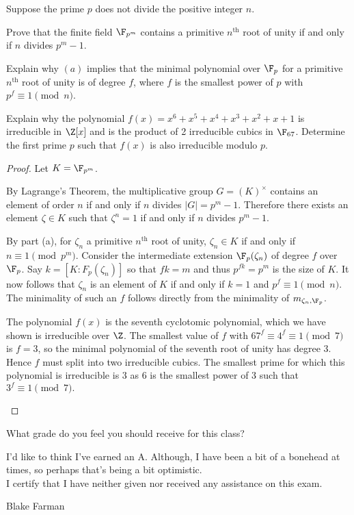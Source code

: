 \documentclass[10pt]{amsart}
\begin{document}
\begin{thm}
  \label{Ex9}
  Suppose the prime $p$ does not divide the positive integer $n$.
  \begin{alphaenum}
  \item
    Prove that the finite field $\F_{p^m}$ contains a primitive $n^{\text{th}}$ root of unity if and only if $n$ divides $p^m - 1$.
  \item
    Explain why $(a)$ implies that the minimal polynomial over $\F_p$ for a primitive $n^{\text{th}}$ root of unity is of degree $f$, where $f$ is the smallest power of $p$ with $p^f \equiv 1 \pmod n$.
  \item
    Explain why the polynomial $f(x) = x^6 + x^5 + x^4 + x^3 + x^2 + x + 1$ is irreducible in $\Z[x]$ and is the product of 2 irreducible cubics in $\F_{67}$.
    Determine the first prime $p$ such that $f(x)$ is also irreducible modulo $p$.
  \end{alphaenum}
  \begin{proof}
    Let $K = \F_{p^m}$.
    \begin{alphaenum}
    \item
        By Lagrange's Theorem, the multiplicative group $G = (K)^{\times}$ contains an element of order $n$ if and only if $n$ divides $|G| = p^m - 1$.
        Therefore there exists an element $\zeta \in K$ such that $\zeta^n = 1$ if and only if $n$ divides $p^m - 1$.
      \item
        By part (a), for $\zeta_n$ a primitive $n^{\text{th}}$ root of unity, $\zeta_n \in K$ if and only if $n \equiv 1 \pmod p^m$.
        Consider the intermediate extension $\F_p(\zeta_n)$ of degree $f$ over $\F_p$.  Say $k = [K:F_p(\zeta_n)]$ so that $fk = m$ and thus $p^{fk} = p^m$ is the size of $K$.
        It now follows that $\zeta_n$ is an element of $K$ if and only if $k = 1$ and $p^{f} \equiv 1 \pmod n$.
        The minimality of such an $f$ follows directly from the minimality of $m_{\zeta_n,\F_p}$.
      \item
        The polynomial $f(x)$ is the seventh cyclotomic polynomial, which we have shown is irreducible over $\Z$.
        The smallest value of $f$ with $67^f \equiv 4^f \equiv 1 \pmod 7$ is $f = 3$, so the minimal polynomial of the seventh root of unity has degree 3.
        Hence $f$ must split into two irreducible cubics.
        The smallest prime for which this polynomial is irreducible is 3 as 6 is the smallest power of 3 such that $3^f \equiv 1 \pmod 7.$
      \end{alphaenum}
  \end{proof}
\end{thm}

\begin{thm}
  What grade do you feel you should receive for this class?
\end{thm}
I'd like to think I've earned an A.  Although, I have been a bit of a bonehead at times, so perhaps that's being a bit optimistic.\\


I certify that I have neither given nor received any assistance on this exam.

\vspace{.75in}

Blake Farman
\end{document}
